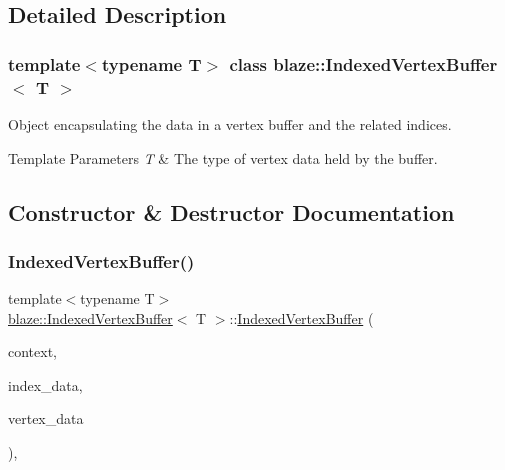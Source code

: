 \subsection{Detailed Description}
\subsubsection*{template$<$typename T$>$\newline
class blaze\+::\+Indexed\+Vertex\+Buffer$<$ T $>$}

Object encapsulating the data in a vertex buffer and the related indices. 


\begin{DoxyTemplParams}{Template Parameters}
{\em T} & The type of vertex data held by the buffer. \\
\hline
\end{DoxyTemplParams}


\subsection{Constructor \& Destructor Documentation}
\mbox{\label{classblaze_1_1IndexedVertexBuffer_a3ba3cbc38b01607efe051c19e1d654d8}} 
\subsubsection{\texorpdfstring{Indexed\+Vertex\+Buffer()}{IndexedVertexBuffer()}}
{\footnotesize\ttfamily template$<$typename T$>$ \\
\hyperlink{classblaze_1_1IndexedVertexBuffer}{blaze\+::\+Indexed\+Vertex\+Buffer}$<$ T $>$\+::\hyperlink{classblaze_1_1IndexedVertexBuffer}{Indexed\+Vertex\+Buffer} (\begin{DoxyParamCaption}\item[{const \hyperlink{classblaze_1_1Context}{Context} $\ast$}]{context,  }\item[{const std\+::vector$<$ uint32\+\_\+t $>$ \&}]{index\+\_\+data,  }\item[{const std\+::vector$<$ T $>$ \&}]{vertex\+\_\+data }\end{DoxyParamCaption})\hspace{0.3cm}{\ttfamily [inline]}, {\ttfamily [noexcept]}}



